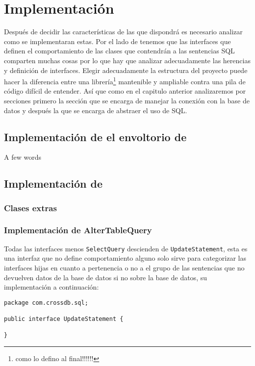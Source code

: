 \chapter{Implementación}
Después de decidir las características de las que dispondrá \jj es necesario analizar como se implementaran estas. Por el lado de \cc tenemos que las interfaces que definen el comportamiento de las clases que contendrán a las sentencias SQL comparten muchas cosas por lo que hay que analizar adecuadamente las herencias y definición de interfaces. Elegir adecuadamente la estructura del proyecto puede hacer la diferencia entre una librería\footnote{como lo defino al final!!!!!!} mantenible y ampliable contra una pila de código difícil de entender. Así que como en el capitulo anterior analizaremos \jj por secciones  primero la sección que se encarga de manejar la conexión con la base de datos y después la que se encarga de abstraer el uso de SQL.






\section{Implementación de el envoltorio de \jj}

A few words




\section{Implementación de \cc}



\subsection{Clases extras}\label{sec:extras}


\subsection{Implementación de AlterTableQuery}
Todas las interfaces menos \verb=SelectQuery= descienden de \verb=UpdateStatement=, esta es una interfaz que no define comportamiento alguno solo sirve para categorizar las interfaces hijas en cuanto a pertenencia o no a el grupo de las sentencias que no devuelven datos de la base de datos si no sobre la base de datos, su implementación a continuación:

\begin{lstlisting}[title=interfaz UpdateStatement]
package com.crossdb.sql;

public interface UpdateStatement {

}
\end{lstlisting}

